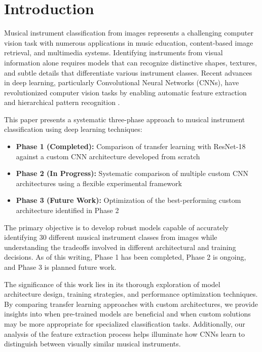 
\section{Introduction}
Musical instrument classification from images represents a challenging computer vision task with numerous applications in music education, content-based image retrieval, and multimedia systems. Identifying instruments from visual information alone requires models that can recognize distinctive shapes, textures, and subtle details that differentiate various instrument classes. Recent advances in deep learning, particularly Convolutional Neural Networks (CNNs), have revolutionized computer vision tasks by enabling automatic feature extraction and hierarchical pattern recognition \cite{krizhevsky2012imagenet, simonyan2014very}.

This paper presents a systematic three-phase approach to musical instrument classification using deep learning techniques:
\begin{itemize}
    \item \textbf{Phase 1 (Completed):} Comparison of transfer learning with ResNet-18 against a custom CNN architecture developed from scratch
    \item \textbf{Phase 2 (In Progress):} Systematic comparison of multiple custom CNN architectures using a flexible experimental framework
    \item \textbf{Phase 3 (Future Work):} Optimization of the best-performing custom architecture identified in Phase 2
\end{itemize}

The primary objective is to develop robust models capable of accurately identifying 30 different musical instrument classes from images while understanding the tradeoffs involved in different architectural and training decisions. As of this writing, Phase 1 has been completed, Phase 2 is ongoing, and Phase 3 is planned future work.

The significance of this work lies in its thorough exploration of model architecture design, training strategies, and performance optimization techniques. By comparing transfer learning approaches with custom architectures, we provide insights into when pre-trained models are beneficial and when custom solutions may be more appropriate for specialized classification tasks. Additionally, our analysis of the feature extraction process helps illuminate how CNNs learn to distinguish between visually similar musical instruments.

